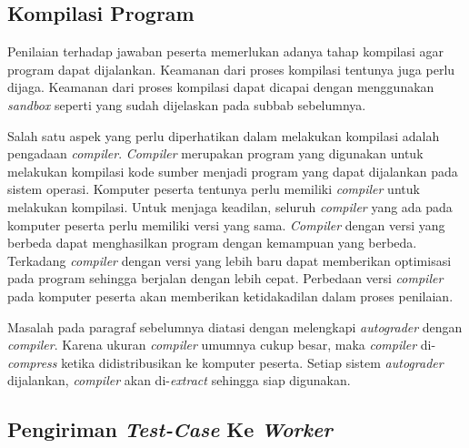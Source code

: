 \subsection{Kompilasi Program}

\par Penilaian terhadap jawaban peserta memerlukan adanya tahap kompilasi agar program dapat dijalankan. Keamanan dari proses kompilasi tentunya juga perlu dijaga. Keamanan dari proses kompilasi dapat dicapai dengan menggunakan \textit{sandbox} seperti yang sudah dijelaskan pada subbab sebelumnya.

\par Salah satu aspek yang perlu diperhatikan dalam melakukan kompilasi adalah pengadaan \textit{compiler}. \textit{Compiler} merupakan program yang digunakan untuk melakukan kompilasi kode sumber menjadi program yang dapat dijalankan pada sistem operasi. Komputer peserta tentunya perlu memiliki \textit{compiler} untuk melakukan kompilasi. Untuk menjaga keadilan, seluruh \textit{compiler} yang ada pada komputer peserta perlu memiliki versi yang sama. \textit{Compiler} dengan versi yang berbeda dapat menghasilkan program dengan kemampuan yang berbeda. Terkadang \textit{compiler} dengan versi yang lebih baru dapat memberikan optimisasi pada program sehingga berjalan dengan lebih cepat. Perbedaan versi \textit{compiler} pada komputer peserta akan memberikan ketidakadilan dalam proses penilaian.

\par Masalah pada paragraf sebelumnya diatasi dengan melengkapi \textit{autograder} dengan \textit{compiler}. Karena ukuran \textit{compiler} umumnya cukup besar, maka \textit{compiler} di-\textit{compress} ketika didistribusikan ke komputer peserta. Setiap sistem \textit{autograder} dijalankan, \textit{compiler} akan di-\textit{extract} sehingga siap digunakan.

\subsection{Pengiriman \textit{Test-Case} Ke \textit{Worker}} \label{subsec:sending-test-case-to-worker}

